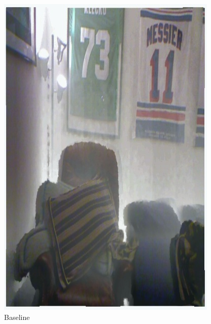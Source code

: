 \documentclass[12pt]{article}
\begin{document}
\begin{figure}[!h]
\begin{minipage}[t]{0.24\linewidth}
        \includegraphics[width=0.9\linewidth]{sample_pictures/after_DHAZY_Baseline.jpg}
        \caption*{Baseline}
    \end{minipage}
    \begin{minipage}[t]{0.24\linewidth}
        \centering

\end{minipage}
\end{figure}
\end{document}
